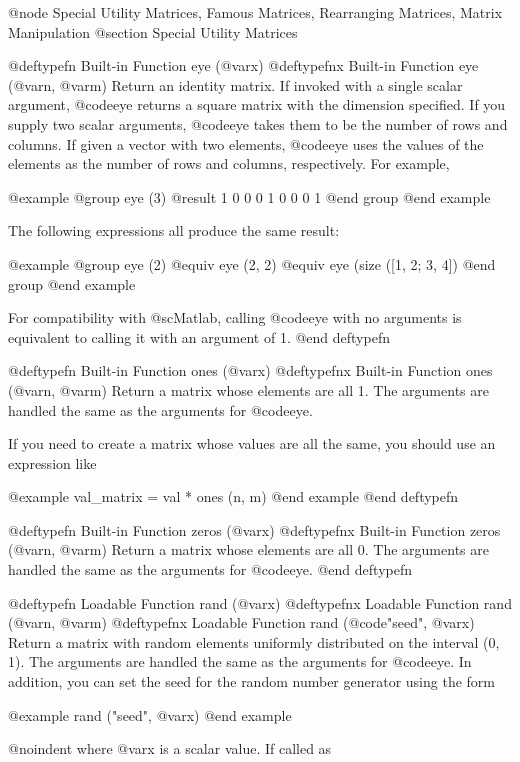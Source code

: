 @node Special Utility Matrices, Famous Matrices, Rearranging Matrices, Matrix Manipulation
@section Special Utility Matrices

@deftypefn {Built-in Function} {} eye (@var{x})
@deftypefnx {Built-in Function} {} eye (@var{n}, @var{m})
Return an identity matrix.  If invoked with a single scalar argument,
@code{eye} returns a square matrix with the dimension specified.  If you
supply two scalar arguments, @code{eye} takes them to be the number of
rows and columns.  If given a vector with two elements, @code{eye} uses
the values of the elements as the number of rows and columns,
respectively.  For example,

@example
@group
eye (3)
     @result{}  1  0  0
         0  1  0
         0  0  1
@end group
@end example

The following expressions all produce the same result:

@example
@group
eye (2)
@equiv{}
eye (2, 2)
@equiv{}
eye (size ([1, 2; 3, 4])
@end group
@end example

For compatibility with @sc{Matlab}, calling @code{eye} with no arguments
is equivalent to calling it with an argument of 1.
@end deftypefn

@deftypefn {Built-in Function} {} ones (@var{x})
@deftypefnx {Built-in Function} {} ones (@var{n}, @var{m})
Return a matrix whose elements are all 1.  The arguments are handled
the same as the arguments for @code{eye}.

If you need to create a matrix whose values are all the same, you should
use an expression like

@example
val_matrix = val * ones (n, m)
@end example
@end deftypefn

@deftypefn {Built-in Function} {} zeros (@var{x})
@deftypefnx {Built-in Function} {} zeros (@var{n}, @var{m})
Return a matrix whose elements are all 0.  The arguments are handled
the same as the arguments for @code{eye}.
@end deftypefn

@deftypefn {Loadable Function} {} rand (@var{x})
@deftypefnx {Loadable Function} {} rand (@var{n}, @var{m})
@deftypefnx {Loadable Function} {} rand (@code{"seed"}, @var{x})
Return a matrix with random elements uniformly distributed on the
interval (0, 1).  The arguments are handled the same as the arguments
for @code{eye}.  In
addition, you can set the seed for the random number generator using the
form

@example
rand ("seed", @var{x})
@end example

@noindent
where @var{x} is a scalar value.  If called as

